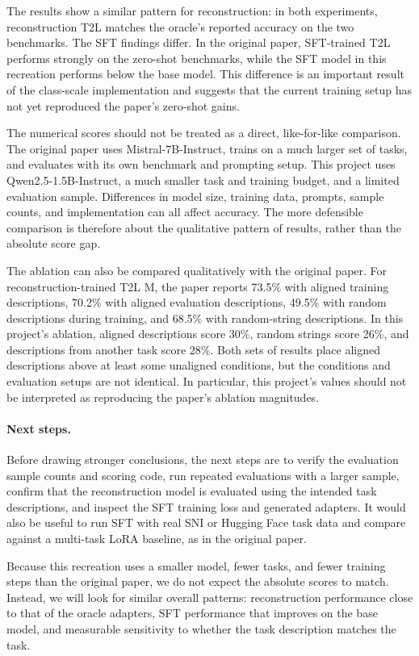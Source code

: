 \documentclass{article}
\begin{document}
The results show a similar pattern for reconstruction: in both experiments, reconstruction T2L matches the oracle's reported accuracy on the two benchmarks. The SFT findings differ. In the original paper, SFT-trained T2L performs strongly on the zero-shot benchmarks, while the SFT model in this recreation performs below the base model. This difference is an important result of the class-scale implementation and suggests that the current training setup has not yet reproduced the paper's zero-shot gains.

The numerical scores should not be treated as a direct, like-for-like comparison. The original paper uses Mistral-7B-Instruct, trains on a much larger set of tasks, and evaluates with its own benchmark and prompting setup. This project uses Qwen2.5-1.5B-Instruct, a much smaller task and training budget, and a limited evaluation sample. Differences in model size, training data, prompts, sample counts, and implementation can all affect accuracy. The more defensible comparison is therefore about the qualitative pattern of results, rather than the absolute score gap.

The ablation can also be compared qualitatively with the original paper. For reconstruction-trained T2L M, the paper reports 73.5\% with aligned training descriptions, 70.2\% with aligned evaluation descriptions, 49.5\% with random descriptions during training, and 68.5\% with random-string descriptions. In this project's ablation, aligned descriptions score 30\%, random strings score 26\%, and descriptions from another task score 28\%. Both sets of results place aligned descriptions above at least some unaligned conditions, but the conditions and evaluation setups are not identical. In particular, this project's values should not be interpreted as reproducing the paper's ablation magnitudes.

\paragraph{Next steps.}
Before drawing stronger conclusions, the next steps are to verify the evaluation sample counts and scoring code, run repeated evaluations with a larger sample, confirm that the reconstruction model is evaluated using the intended task descriptions, and inspect the SFT training loss and generated adapters. It would also be useful to run SFT with real SNI or Hugging Face task data and compare against a multi-task LoRA baseline, as in the original paper.


Because this recreation uses a smaller model, fewer tasks, and fewer training steps than the original paper, we do not expect the absolute scores to match. Instead, we will look for similar overall patterns: reconstruction performance close to that of the oracle adapters, SFT performance that improves on the base model, and measurable sensitivity to whether the task description matches the task.
\end{document}
